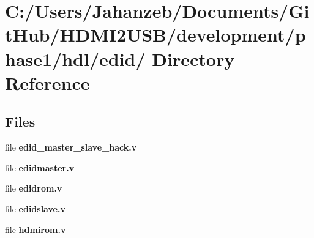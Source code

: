 \section{C\-:/\-Users/\-Jahanzeb/\-Documents/\-Git\-Hub/\-H\-D\-M\-I2\-U\-S\-B/development/phase1/hdl/edid/ Directory Reference}
\label{dir_b8aad34a9d12d5d1d10f1f712c89d5af}
\subsection*{Files}
\begin{DoxyCompactItemize}
\item 
file {\bf edid\-\_\-master\-\_\-slave\-\_\-hack.\-v}
\item 
file {\bf edidmaster.\-v}
\item 
file {\bf edidrom.\-v}
\item 
file {\bf edidslave.\-v}
\item 
file {\bf hdmirom.\-v}
\end{DoxyCompactItemize}
